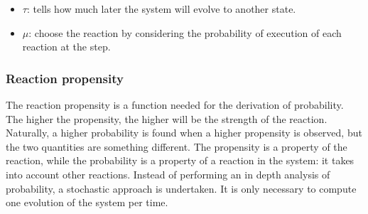     \begin{multicols}{2}
      \begin{itemize}
        \item \(\tau\): tells how much later the system will evolve to another state.
        \item \(\mu\): choose the reaction by considering the probability of execution of each reaction at the step.
      \end{itemize}
    \end{multicols}

    \subsubsection{Reaction propensity}
    The reaction propensity is a function needed for the derivation of probability.
    The higher the propensity, the higher will be the strength of the reaction.
    Naturally, a higher probability is found when a higher propensity is observed, but the two quantities are something different.
    The propensity is a property of the reaction, while the probability is a property of a reaction in the system: it takes into account other reactions.
    Instead of performing an in depth analysis of probability, a stochastic approach is undertaken.
    It is only necessary to compute one evolution of the system per time.
